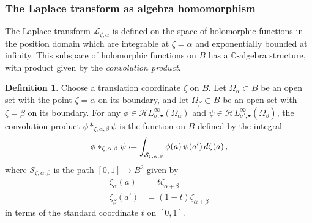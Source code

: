 \documentclass{article}
\newcommand{\singexp}[2]{\mathcal{H}L^\infty_{#1, #2}}
\newcommand{\singexpalg}[1]{\singexp{#1}{\bullet}}
\newcommand{\C}{\mathbb{C}}
\newcommand*{\defeq}{\mathrel{\vcenter{\baselineskip0.5ex \lineskiplimit0pt
                     \hbox{\scriptsize.}\hbox{\scriptsize.}}}%
                     =}
\newcommand{\laplace}{\mathcal{L}}
\theoremstyle{definition}
\newtheorem{definition}{Definition}[section]
\theoremstyle{plain}
\begin{document}
\subsubsection*{The Laplace transform as algebra homomorphism}
The Laplace transform $\laplace_{\zeta,\alpha}$ is defined on the space of holomorphic functions in the position domain which are integrable at $\zeta=\alpha$ and exponentially bounded at infinity. This subspace of holomorphic functions on $B$ has a $\C$-algebra structure, with product given by the \textit{convolution product}. 
\begin{definition}\label{def:convolution}
Choose a translation coordinate $\zeta$ on $B$. Let $\Omega_\alpha \subset B$ be an open set with the point $\zeta = \alpha$ on its boundary, and let $\Omega_\beta \subset B$ be an open set with $\zeta = \beta$ on its boundary. For any $\phi \in \singexpalg{\sigma}(\Omega_\alpha)$ and $\psi \in \singexpalg{\sigma'}(\Omega_\beta)$, the convolution product $\phi \ast_{\zeta, \alpha, \beta} \psi$ is the function on $B$ defined by the integral
\begin{equation}%
\phi \ast_{\zeta, \alpha, \beta} \psi \defeq \int_{\mathcal{S}_{\zeta, \alpha, \beta}} \phi(a)\,\psi(a')\,d\zeta(a)\,,
\end{equation}
where $\mathcal{S}_{\zeta, \alpha, \beta}$ is the path $[0, 1] \to B^2$ given by
\begin{align*}
\zeta_\alpha(a) & = t\zeta_{\alpha+\beta} \\
\zeta_\beta(a') & = (1-t)\zeta_{\alpha+\beta}
\end{align*}
in terms of the standard coordinate $t$ on $[0, 1]$.
\end{definition}
\end{document}

